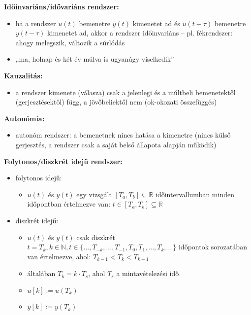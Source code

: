 \noindent \textbf{Időinvariáns/idővariáns rendszer:}
\begin{itemize}
    \item ha a rendszer $u(t)$ bemenetre $y(t)$ kimenetet ad és $u(t-\tau)$ bemenetre $y(t-\tau)$ kimenetet ad, akkor a rendszer időinvariáns – pl. fékrendszer: ahogy melegszik, változik a súrlódás
    \item „ma, holnap és két év múlva is ugyanúgy viselkedik”
\end{itemize}

\noindent \textbf{Kauzalitás:}
\begin{itemize}
    \item a rendszer kimenete (válasza) csak a jelenlegi és a múltbeli bemenetektől (gerjesztésektől) függ, a jövőbeliektől nem (ok-okozati összefüggés)
\end{itemize}

\noindent \textbf{Autonómia:}
\begin{itemize}
    \item autonóm rendszer: a bemenetnek nincs hatása a kimenetre (nincs külső gerjesztés, a rendszer csak a saját belső állapota alapján működik)
\end{itemize}

\noindent \textbf{Folytonos/diszkrét idejű rendszer:}
\begin{itemize}
    \item folytonos idejű:
          \begin{itemize}
              \item $u(t)$ és $y(t)$ egy vizsgált $[T_a, T_b] \subseteq \mathbb{R}$ időintervallumban minden időpontban értelmezve van: $t \in [T_a, T_b] \subseteq \mathbb{R}$
          \end{itemize}
    \item diszkrét idejű:
          \begin{itemize}
              \item $u(t)$ és $y(t)$ csak diszkrét $t = T_k, k \in \mathbb{N}, t \in \{..., T_{-k}, ..., T_{-1}, T_0, T_1, ..., T_k, ...\}$ időpontok sorozatában van értelmezve, ahol: $T_{k-1} < T_k < T_{k+1}$
              \item általában $T_k = k \cdot T_s$, ahol $T_s$ a mintavételezési idő
              \item $u[k] := u(T_k)$
              \item $y[k] := y(T_k)$
          \end{itemize}
\end{itemize}

